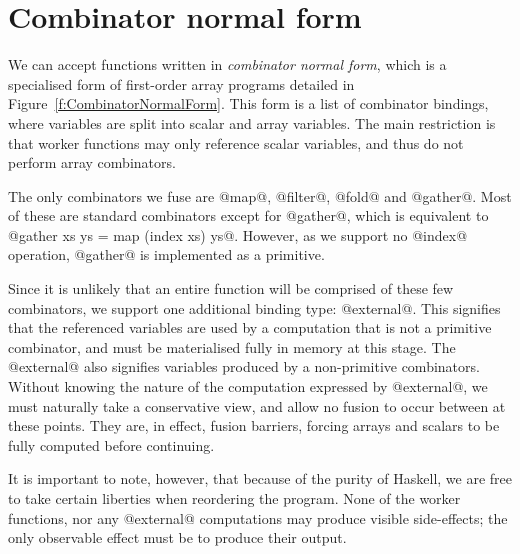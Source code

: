 \section{Combinator normal form}
We can accept functions written in \emph{combinator normal form}, which is a specialised form of first-order array programs detailed in Figure~\ref{f:CombinatorNormalForm}.
This form is a list of combinator bindings, where variables are split into scalar and array variables.
The main restriction is that worker functions may only reference scalar variables, and thus do not perform array combinators.

The only combinators we fuse are @map@, @filter@, @fold@ and @gather@.
Most of these are standard combinators except for @gather@, which is equivalent to @gather xs ys = map (index xs) ys@.
However, as we support no @index@ operation, @gather@ is implemented as a primitive.

Since it is unlikely that an entire function will be comprised of these few combinators, we support one additional binding type: @external@. This signifies that the referenced variables are used by a computation that is not a primitive combinator, and must be materialised fully in memory at this stage.
The @external@ also signifies variables produced by a non-primitive combinators.
Without knowing the nature of the computation expressed by @external@, we must naturally take a conservative view, and allow no fusion to occur between at these points. They are, in effect, fusion barriers, forcing arrays and scalars to be fully computed before continuing.

It is important to note, however, that because of the purity of Haskell, we are free to take certain liberties when reordering the program.
None of the worker functions, nor any @external@ computations may produce visible side-effects; the only observable effect must be to produce their output.



